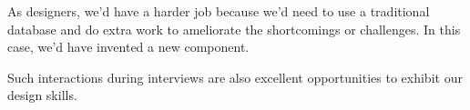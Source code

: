 As designers, we'd have a harder job because we'd need to use a traditional database and do extra work to ameliorate the shortcomings or challenges. In this case, we'd have invented a new component.

Such interactions during interviews are also excellent opportunities to exhibit our design skills.